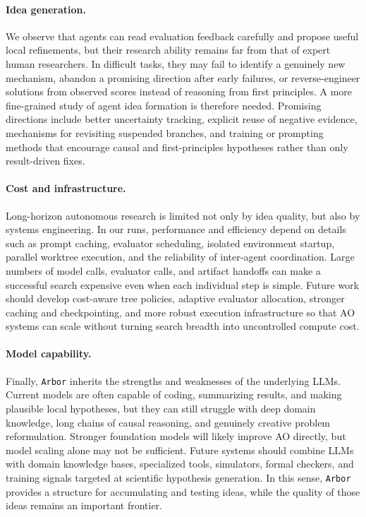 \documentclass{llmxive}
\providecommand{\arbor}{\texttt{Arbor}}
\begin{document}
\paragraph{Idea generation.}
We observe that agents can read evaluation feedback carefully and propose useful
local refinements, but their research ability remains far from that of expert
human researchers. In difficult tasks, they may fail to identify a genuinely new
mechanism, abandon a promising direction after early failures, or reverse-engineer
solutions from observed scores instead of reasoning from first principles. A more
fine-grained study of agent idea formation is therefore needed. Promising
directions include better uncertainty tracking, explicit reuse of negative
evidence, mechanisms for revisiting suspended branches, and training or prompting
methods that encourage causal and first-principles hypotheses rather than only
result-driven fixes.

\paragraph{Cost and infrastructure.}
Long-horizon autonomous research is limited not only by idea quality, but also
by systems engineering. In our runs, performance and efficiency depend on details
such as prompt caching, evaluator scheduling, isolated environment startup,
parallel worktree execution, and the reliability of inter-agent coordination.
Large numbers of model calls, evaluator calls, and artifact handoffs can make a
successful search expensive even when each individual step is simple. Future work
should develop cost-aware tree policies, adaptive evaluator allocation, stronger
caching and checkpointing, and more robust execution infrastructure so that AO
systems can scale without turning search breadth into uncontrolled compute cost.

\paragraph{Model capability.}
Finally, \arbor{} inherits the strengths and weaknesses of the underlying LLMs.
Current models are often capable of coding, summarizing results, and making
plausible local hypotheses, but they can still struggle with deep domain
knowledge, long chains of causal reasoning, and genuinely creative problem
reformulation. Stronger foundation models will likely improve AO directly, but
model scaling alone may not be sufficient. Future systems should combine LLMs
with domain knowledge bases, specialized tools, simulators, formal checkers, and
training signals targeted at scientific hypothesis generation. In this sense,
\arbor{} provides a structure for accumulating and testing ideas, while the
quality of those ideas remains an important frontier.
\end{document}

